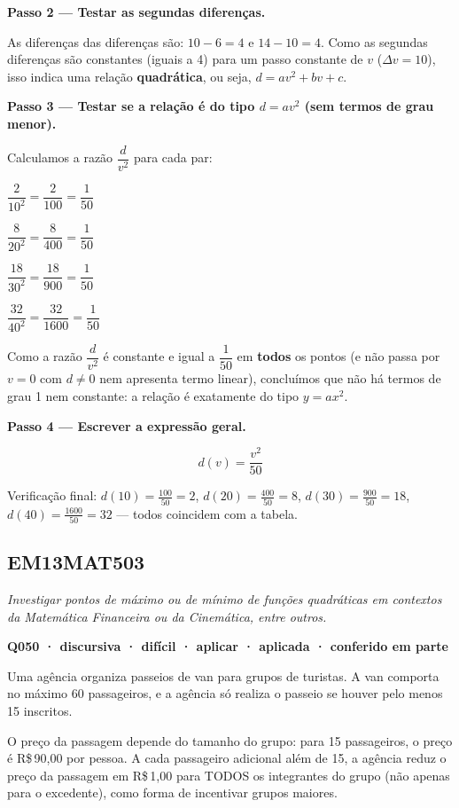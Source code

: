 \documentclass[11pt,a4paper]{article}
\begin{document}
\textbf{Passo 2 — Testar as segundas diferenças.}

As diferenças das diferenças são: $10-6=4$ e $14-10=4$. Como as segundas diferenças são constantes (iguais a 4) para um passo constante de $v$ ($\Delta v = 10$), isso indica uma relação \textbf{quadrática}, ou seja, $d = av^2 + bv + c$.

\textbf{Passo 3 — Testar se a relação é do tipo $d = av^2$ (sem termos de grau menor).}

Calculamos a razão $\dfrac{d}{v^2}$ para cada par:

$\dfrac{2}{10^2} = \dfrac{2}{100} = \dfrac{1}{50}$

$\dfrac{8}{20^2} = \dfrac{8}{400} = \dfrac{1}{50}$

$\dfrac{18}{30^2} = \dfrac{18}{900} = \dfrac{1}{50}$

$\dfrac{32}{40^2} = \dfrac{32}{1600} = \dfrac{1}{50}$

Como a razão $\dfrac{d}{v^2}$ é constante e igual a $\dfrac{1}{50}$ em \textbf{todos} os pontos (e não passa por $v=0$ com $d\neq 0$ nem apresenta termo linear), concluímos que não há termos de grau 1 nem constante: a relação é exatamente do tipo $y = ax^2$.

\textbf{Passo 4 — Escrever a expressão geral.}

$$d(v) = \dfrac{v^2}{50}$$

Verificação final: $d(10)=\frac{100}{50}=2$, $d(20)=\frac{400}{50}=8$, $d(30)=\frac{900}{50}=18$, $d(40)=\frac{1600}{50}=32$ — todos coincidem com a tabela.
\subsection*{EM13MAT503}
{\small\itshape Investigar pontos de máximo ou de mínimo de funções quadráticas em contextos da Matemática Financeira ou da Cinemática, entre outros.}

\bigskip\noindent\textbf{Q050 · discursiva · difícil · aplicar · aplicada · conferido em parte}\par\nopagebreak
Uma agência organiza passeios de van para grupos de turistas. A van comporta no máximo 60 passageiros, e a agência só realiza o passeio se houver pelo menos 15 inscritos.

O preço da passagem depende do tamanho do grupo: para 15 passageiros, o preço é R\$\,90,00 por pessoa. A cada passageiro adicional além de 15, a agência reduz o preço da passagem em R\$\,1,00 para TODOS os integrantes do grupo (não apenas para o excedente), como forma de incentivar grupos maiores.
\end{document}
